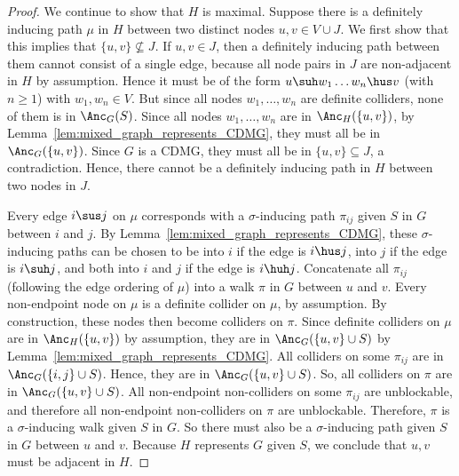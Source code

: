 \begin{proof}
  We continue to show that $H$ is maximal.
  Suppose there is a definitely inducing path $\mu$ in $H$ between two distinct nodes $u,v \in V \cup J$. 
  We first show that this implies that $\{u,v\} \not\subseteq J$.
  If $u,v \in J$, then a definitely inducing path between them cannot consist of a single edge, because all node pairs in $J$ are non-adjacent in $H$ by assumption.
  Hence it must be of the form $u \suh w_1 \dots w_n \hus v$ (with $n \ge 1$) with $w_1, w_n \in V$. 
  But since all nodes $w_1,\dots,w_n$ are definite colliders, none of them is in $\Anc_G(S)$.
  Since all nodes $w_1,\dots,w_n$ are in $\Anc_H(\{u,v\})$, by Lemma~\ref{lem:mixed_graph_represents_CDMG}, they must all be in $\Anc_G(\{u,v\})$.
  Since $G$ is a CDMG, they must all be in $\{u,v\} \subseteq J$, a contradiction.
  Hence, there cannot be a definitely inducing path in $H$ between two nodes in $J$.

  Every edge $i \sus j$ on $\mu$ corresponds with a $\sigma$-inducing path $\pi_{ij}$ given $S$ in $G$ between $i$ and $j$.
  By Lemma~\ref{lem:mixed_graph_represents_CDMG}, these $\sigma$-inducing paths can be chosen to be into $i$ if the edge is $i \hus j$, into $j$ if the edge is $i \suh j$, and both into $i$ and $j$ if the edge is $i \huh j$. 
  Concatenate all $\pi_{ij}$ (following the edge ordering of $\mu$) into a walk $\pi$ in $G$ between $u$ and $v$.
  Every non-endpoint node on $\mu$ is a definite collider on $\mu$, by assumption.
  By construction, these nodes then become colliders on $\pi$.
  Since definite colliders on $\mu$ are in $\Anc_H(\{u,v\})$ by assumption, they are in $\Anc_G(\{u,v\} \cup S)$ by Lemma~\ref{lem:mixed_graph_represents_CDMG}.
  All colliders on some $\pi_{ij}$ are in $\Anc_G(\{i,j\}\cup S)$.
  Hence, they are in $\Anc_G(\{u,v\}\cup S)$.
  So, all colliders on $\pi$ are in $\Anc_G(\{u,v\}\cup S)$.
  All non-endpoint non-colliders on some $\pi_{ij}$ are unblockable, and therefore all non-endpoint non-colliders on $\pi$ are unblockable.
  Therefore, $\pi$ is a $\sigma$-inducing walk given $S$ in $G$.
  So there must also be a $\sigma$-inducing path given $S$ in $G$ between $u$ and $v$.
  Because $H$ represents $G$ given $S$, we conclude that $u,v$ must be adjacent in $H$.
\end{proof}
